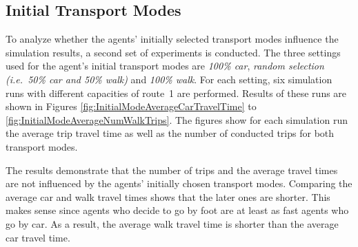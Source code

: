 \subsection{Initial Transport Modes}

To analyze whether the agents' initially selected transport modes influence the simulation results, a second set of experiments is conducted. The three settings used for the agent's initial transport modes are \textit{100\% car}, \textit{random selection (i.e.\ 50\% car and 50\% walk)} and \textit{100\% walk}. For each setting, six simulation runs with different capacities of route~1 are performed. Results of these runs are shown in Figures \ref{fig:InitialModeAverageCarTravelTime} to \ref{fig:InitialModeAverageNumWalkTrips}. The figures show for each simulation run the average trip travel time as well as the number of conducted trips for both transport modes.

The results demonstrate that the number of trips and the average travel times are not influenced by the agents' initially chosen transport modes. Comparing the average car and walk travel times shows that the later ones are shorter. This makes sense since agents who decide to go by foot are at least as fast agents who go by car. As a result, the average walk travel time is shorter than the average car travel time. 


